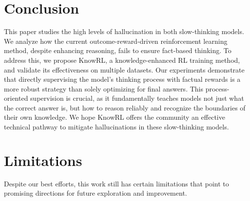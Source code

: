 \section{Conclusion}
This paper studies the high levels of hallucination in both slow-thinking models. We analyze how the current outcome-reward-driven reinforcement learning method, despite enhancing reasoning, fails to ensure fact-based thinking. 
To address this, we propose KnowRL, a knowledge-enhanced RL training method, and validate its effectiveness on multiple datasets. 
Our experiments demonstrate that directly supervising the model's thinking process with factual rewards is a more robust strategy than solely optimizing for final answers.
This process-oriented supervision is crucial, as it fundamentally teaches models not just what the correct answer is, but how to reason reliably and recognize the boundaries of their own knowledge. 
We hope KnowRL offers the community an effective technical pathway to mitigate hallucinations in these slow-thinking models.




\section*{Limitations}
Despite our best efforts, this work still has certain limitations that point to promising directions for future exploration and improvement.

